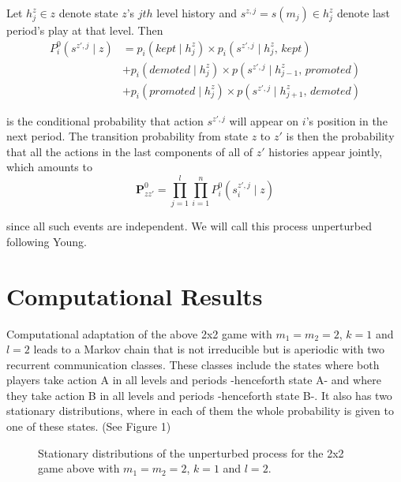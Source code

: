 \documentclass[11pt, a4paper, leqno]{article}
\begin{document}
Let $ h^z_j \in z $ denote state $z$'s $jth$ level history and $s^{z,j} = s(m_j) \in h^z_j$ denote last period's play at that level. Then
\begin{align*}
    P_{i}^0( s^{z',j} \mid z ) &= p_i(kept \mid h^z_j) \times p_i( s^{z',j} \mid h^z_j \textit{, kept})\\
    &+ p_i(demoted \mid h^z_j) \times p(s^{z',j} \mid h^z_{j-1} \textit{, promoted}) \\
   &+ p_i(promoted \mid h^z_j) \times p(s^{z',j}\mid h^z_{j+1} \textit{, demoted})
\end{align*}

is the conditional probability that action $s^{z',j}$ will appear on $i$'s position in the next period. The transition probability from state $z$ to $z'$ is then the probability that all the actions in the last components of all of $z'$ histories appear jointly, which amounts to
\[ \mathbf{P}_{zz'}^0 = \prod\limits_{j=1}^{l} \prod\limits_{i=1}^{n} P_{i}^0( s^{z',j}_i \mid z )\]

since all such events are independent. We will call this process unperturbed following Young. 

\section*{Computational Results}

Computational adaptation of the above 2x2 game with $m_1=m_2=2$, $k=1$ and $l=2$ leads to a Markov chain that is not irreducible but is aperiodic with two recurrent communication classes. These classes include the states where both players take action A  in all levels and periods -henceforth state A- and where they take action B in all levels and periods -henceforth state B-. It also has two stationary distributions, where in each of them the whole probability is given to one of these states. (See Figure 1)



\begin{figure}
    \centering
    \hfill  %

    \caption{Stationary distributions of the unperturbed process for the 2x2 game above with $m_1=m_2=2$, $k=1$ and $l=2$.}

\end{figure}
\end{document}
